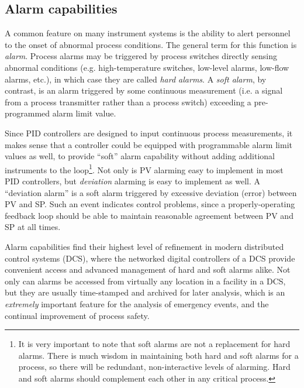 \filbreak
\subsection{Alarm capabilities}

A common feature on many instrument systems is the ability to alert personnel to the onset of abnormal process conditions.  The general term for this function is \textit{alarm}.  Process alarms may be triggered by process switches directly sensing abnormal conditions (e.g. high-temperature switches, low-level alarms, low-flow alarms, etc.), in which case they are called \textit{hard alarms}.  A \textit{soft alarm}, by contrast, is an alarm triggered by some continuous measurement (i.e. a signal from a process transmitter rather than a process switch) exceeding a pre-programmed alarm limit value.        

Since PID controllers are designed to input continuous process measurements, it makes sense that a controller could be equipped with programmable alarm limit values as well, to provide ``soft'' alarm capability without adding additional instruments to the loop\footnote{It is very important to note that soft alarms are not a replacement for hard alarms.  There is much wisdom in maintaining both hard and soft alarms for a process, so there will be redundant, non-interactive levels of alarming.  Hard and soft alarms should complement each other in any critical process.}.  Not only is PV alarming easy to implement in most PID controllers, but \textit{deviation} alarming is easy to implement as well.  A ``deviation alarm'' is a soft alarm triggered by excessive deviation (error) between PV and SP.  Such an event indicates control problems, since a properly-operating feedback loop should be able to maintain reasonable agreement between PV and SP at all times.  

Alarm capabilities find their highest level of refinement in modern distributed control systems (DCS), where the networked digital controllers of a DCS provide convenient access and advanced management of hard and soft alarms alike.  Not only can alarms be accessed from virtually any location in a facility in a DCS, but they are usually time-stamped and archived for later analysis, which is an \textit{extremely} important feature for the analysis of emergency events, and the continual improvement of process safety.








